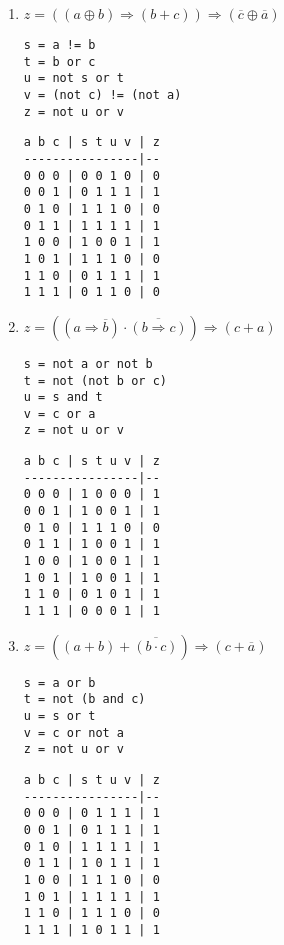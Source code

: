 \documentclass[11pt,a4paper]{article}
\begin{document}
\begin{enumerate}
\item $z = ((a \oplus b) \Rightarrow (b + c)) \Rightarrow (\overline{c} \oplus \overline{a})$
\hfill
\begin{minipage}[t]{4cm}\footnotesize
\begin{Verbatim}
s = a != b
t = b or c
u = not s or t
v = (not c) != (not a)
z = not u or v
\end{Verbatim}
\end{minipage}
\hspace*{3mm}
\begin{minipage}[t]{3.5cm}\footnotesize
\begin{Verbatim}
a b c | s t u v | z
----------------|--
0 0 0 | 0 0 1 0 | 0
0 0 1 | 0 1 1 1 | 1
0 1 0 | 1 1 1 0 | 0
0 1 1 | 1 1 1 1 | 1
1 0 0 | 1 0 0 1 | 1
1 0 1 | 1 1 1 0 | 0
1 1 0 | 0 1 1 1 | 1
1 1 1 | 0 1 1 0 | 0
\end{Verbatim}
\end{minipage}
\vspace*{3mm}

\item $z = ((a \Rightarrow \overline{b}) \cdot \overline{(b \Rightarrow c)}) \Rightarrow ({c} + {a})$
\hfill
\begin{minipage}[t]{4cm}\footnotesize
\begin{Verbatim}
s = not a or not b
t = not (not b or c)
u = s and t
v = c or a
z = not u or v
\end{Verbatim}
\end{minipage}
\hspace*{3mm}
\begin{minipage}[t]{3.5cm}\footnotesize
\begin{Verbatim}
a b c | s t u v | z
----------------|--
0 0 0 | 1 0 0 0 | 1
0 0 1 | 1 0 0 1 | 1
0 1 0 | 1 1 1 0 | 0
0 1 1 | 1 0 0 1 | 1
1 0 0 | 1 0 0 1 | 1
1 0 1 | 1 0 0 1 | 1
1 1 0 | 0 1 0 1 | 1
1 1 1 | 0 0 0 1 | 1
\end{Verbatim}
\end{minipage}
\vspace*{3mm}

\item $z = ({(a + b)} + \overline{(b \cdot c)}) \Rightarrow ({c} + \overline{a})$
\hfill
\begin{minipage}[t]{4cm}\footnotesize
\begin{Verbatim}
s = a or b
t = not (b and c)
u = s or t
v = c or not a
z = not u or v
\end{Verbatim}
\end{minipage}
\hspace*{3mm}
\begin{minipage}[t]{3.5cm}\footnotesize
\begin{Verbatim}
a b c | s t u v | z
----------------|--
0 0 0 | 0 1 1 1 | 1
0 0 1 | 0 1 1 1 | 1
0 1 0 | 1 1 1 1 | 1
0 1 1 | 1 0 1 1 | 1
1 0 0 | 1 1 1 0 | 0
1 0 1 | 1 1 1 1 | 1
1 1 0 | 1 1 1 0 | 0
1 1 1 | 1 0 1 1 | 1
\end{Verbatim}
\end{minipage}
\vspace*{3mm}


\end{enumerate}
\end{document}
